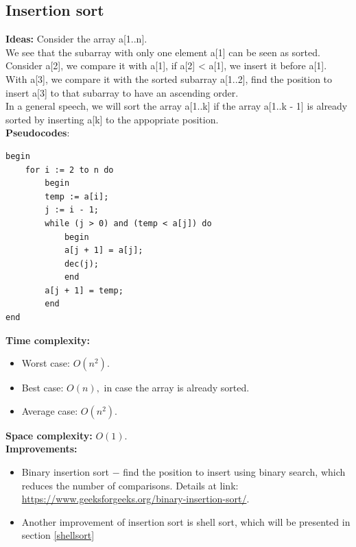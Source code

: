 \documentclass[12pt,a4paper]{article}
\begin{document}
\subsection{Insertion sort}
\textbf{Ideas:} Consider the array a[1..n].\\
We see that the subarray with only one element a[1] can be seen as sorted.\\
Consider a[2], we compare it with a[1], if a[2] < a[1], we insert it before a[1].\\
With a[3], we compare it with the sorted subarray a[1..2], find the position to insert a[3] to that subarray to have an ascending order.\\
In a general speech, we will sort the array a[1..k] if the array a[1..k - 1] is already sorted by inserting a[k] to the appopriate position.\\
\textbf{Pseudocodes}: \cite{gtvlt}
\lstset{language=Pascal} 
\begin{lstlisting}
begin
	for i := 2 to n do
		begin
		temp := a[i];
		j := i - 1;
		while (j > 0) and (temp < a[j]) do
			begin
			a[j + 1] = a[j];
			dec(j);
			end
		a[j + 1] = temp;
		end
end
\end{lstlisting}
\textbf{Time complexity: } \cite{comp}
\begin{itemize}
\item Worst case: $O \left( {n^2} \right).$
\item Best case: $O \left( {n} \right),$ in case the array is already sorted.
\item Average case: $O \left( {n^2} \right).$
\end{itemize}
\textbf{Space complexity:} $O \left( {1} \right).$ \cite{comp}\\
\textbf{Improvements:}
\begin{itemize}
\item Binary insertion sort $-$ find the position to insert using binary search, which reduces the number of comparisons. Details at link: \url{https://www.geeksforgeeks.org/binary-insertion-sort/}.
\item Another improvement of insertion sort is shell sort, which will be presented in section \ref{shellsort}
\end{itemize}
\end{document}
